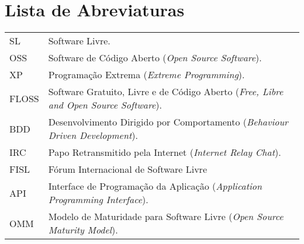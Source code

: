 \documentclass[12pt,twoside,letterpaper]{book}
\begin{document}
\tableofcontents %


\chapter{Lista de Abreviaturas}
\begin{tabular}{ll}
 		SL       & Software Livre.\\
 		OSS         & Software de Código Aberto (\emph{Open Source Software}).\\
 		XP       & Programação Extrema (\emph{Extreme Programming}).\\
 		FLOSS       & Software Gratuito, Livre e de Código Aberto (\emph{Free, Libre and Open Source
 Software}).\\
 		BDD       & Desenvolvimento Dirigido por Comportamento (\emph{Behaviour Driven Development}).\\
 		IRC       & Papo Retransmitido pela Internet (\emph{Internet Relay Chat}).\\
 		FISL       & Fórum Internacional de Software Livre\\
 		API       & Interface de Programação da Aplicação (\emph{Application Programming Interface}).\\ 
                OMM       & Modelo de Maturidade para Software Livre (\emph{Open Source Maturity Model}).\\
\end{tabular}



\mainmatter

\onehalfspacing              %
\end{document}
